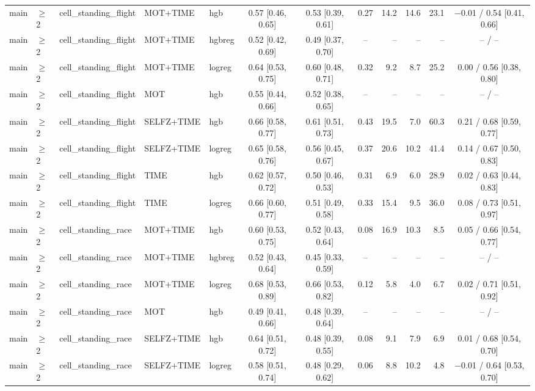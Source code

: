 \begin{longtable}{@{}lllllcccrrrc@{}}
main & $\geq$2 & cell\_standing\_flight & MOT+TIME & hgb & 0.57 [0.46, 0.65] & 0.53 [0.39, 0.61] & 0.27 & 14.2 & 14.6 & 23.1 & $-$0.01 / 0.54 [0.41, 0.66] \\
main & $\geq$2 & cell\_standing\_flight & MOT+TIME & hgbreg & 0.52 [0.42, 0.69] & 0.49 [0.37, 0.70] & -- & -- & -- & -- & -- / -- \\
main & $\geq$2 & cell\_standing\_flight & MOT+TIME & logreg & 0.64 [0.53, 0.75] & 0.60 [0.48, 0.71] & 0.32 & 9.2 & 8.7 & 25.2 & 0.00 / 0.56 [0.38, 0.80] \\
main & $\geq$2 & cell\_standing\_flight & MOT & hgb & 0.55 [0.44, 0.66] & 0.52 [0.38, 0.65] & -- & -- & -- & -- & -- / -- \\
main & $\geq$2 & cell\_standing\_flight & SELFZ+TIME & hgb & 0.66 [0.58, 0.77] & 0.61 [0.51, 0.73] & 0.43 & 19.5 & 7.0 & 60.3 & 0.21 / 0.68 [0.59, 0.77] \\
main & $\geq$2 & cell\_standing\_flight & SELFZ+TIME & logreg & 0.65 [0.58, 0.76] & 0.56 [0.45, 0.67] & 0.37 & 20.6 & 10.2 & 41.4 & 0.14 / 0.67 [0.50, 0.83] \\
main & $\geq$2 & cell\_standing\_flight & TIME & hgb & 0.62 [0.57, 0.72] & 0.50 [0.46, 0.53] & 0.31 & 6.9 & 6.0 & 28.9 & 0.02 / 0.63 [0.44, 0.83] \\
main & $\geq$2 & cell\_standing\_flight & TIME & logreg & 0.66 [0.60, 0.77] & 0.51 [0.49, 0.58] & 0.33 & 15.4 & 9.5 & 36.0 & 0.08 / 0.73 [0.51, 0.97] \\
main & $\geq$2 & cell\_standing\_race & MOT+TIME & hgb & 0.60 [0.53, 0.75] & 0.52 [0.43, 0.64] & 0.08 & 16.9 & 10.3 & 8.5 & 0.05 / 0.66 [0.54, 0.77] \\
main & $\geq$2 & cell\_standing\_race & MOT+TIME & hgbreg & 0.52 [0.43, 0.64] & 0.45 [0.33, 0.59] & -- & -- & -- & -- & -- / -- \\
main & $\geq$2 & cell\_standing\_race & MOT+TIME & logreg & 0.68 [0.53, 0.89] & 0.66 [0.53, 0.82] & 0.12 & 5.8 & 4.0 & 6.7 & 0.02 / 0.71 [0.51, 0.92] \\
main & $\geq$2 & cell\_standing\_race & MOT & hgb & 0.49 [0.41, 0.66] & 0.48 [0.39, 0.64] & -- & -- & -- & -- & -- / -- \\
main & $\geq$2 & cell\_standing\_race & SELFZ+TIME & hgb & 0.64 [0.51, 0.72] & 0.48 [0.39, 0.55] & 0.08 & 9.1 & 7.9 & 6.9 & 0.01 / 0.68 [0.54, 0.70] \\
main & $\geq$2 & cell\_standing\_race & SELFZ+TIME & logreg & 0.58 [0.51, 0.74] & 0.48 [0.29, 0.62] & 0.06 & 8.8 & 10.2 & 4.8 & $-$0.01 / 0.64 [0.53, 0.70] \\

\end{longtable}
